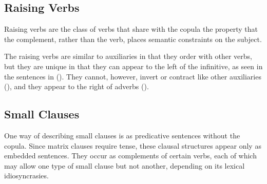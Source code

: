 \subsection{Raising Verbs}
\label{raising-verbs}

Raising verbs are the class of verbs that share with the copula the property
that the complement, rather than the verb, places semantic constraints on
the subject.  



The raising verbs are similar to auxiliaries in that they order with other
verbs, but they are unique in that they can appear to the left of the
infinitive, as seen in the sentences in ({}).  They cannot, however,
invert or contract like other auxiliaries ({}), and they appear to the
right of adverbs ({}).




\subsection{Small Clauses}

One way of describing small clauses is as predicative sentences without the
copula.  Since matrix clauses require tense, these clausal structures appear
only as embedded sentences.  They occur as complements of certain verbs, each
of which may allow one type of small clause but not another, depending on its
lexical idiosyncrasies.


